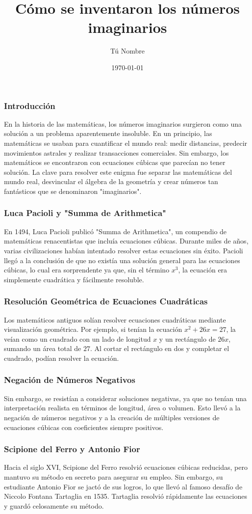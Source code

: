 \documentclass{beamer}
\title{Cómo se inventaron los números imaginarios}
\author{Tú Nombre}
\date{\today}
\begin{document}
\frame{\titlepage}

\begin{frame}
\frametitle{Introducción}
En la historia de las matemáticas, los números imaginarios surgieron como una solución a un problema aparentemente insoluble. En un principio, las matemáticas se usaban para cuantificar el mundo real: medir distancias, predecir movimientos astrales y realizar transacciones comerciales. Sin embargo, los matemáticos se encontraron con ecuaciones cúbicas que parecían no tener solución. La clave para resolver este enigma fue separar las matemáticas del mundo real, desvincular el álgebra de la geometría y crear números tan fantásticos que se denominaron "imaginarios".
\end{frame}

\begin{frame}
\frametitle{Luca Pacioli y "Summa de Arithmetica"}
En 1494, Luca Pacioli publicó "Summa de Arithmetica", un compendio de matemáticas renacentistas que incluía ecuaciones cúbicas. Durante miles de años, varias civilizaciones habían intentado resolver estas ecuaciones sin éxito. Pacioli llegó a la conclusión de que no existía una solución general para las ecuaciones cúbicas, lo cual era sorprendente ya que, sin el término $x^3$, la ecuación era simplemente cuadrática y fácilmente resoluble.
\end{frame}

\begin{frame}
\frametitle{Resolución Geométrica de Ecuaciones Cuadráticas}
Los matemáticos antiguos solían resolver ecuaciones cuadráticas mediante visualización geométrica. Por ejemplo, si tenían la ecuación $x^2 + 26x = 27$, la veían como un cuadrado con un lado de longitud $x$ y un rectángulo de $26x$, sumando un área total de $27$. Al cortar el rectángulo en dos y completar el cuadrado, podían resolver la ecuación.
\end{frame}

\begin{frame}
\frametitle{Negación de Números Negativos}
Sin embargo, se resistían a considerar soluciones negativas, ya que no tenían una interpretación realista en términos de longitud, área o volumen. Esto llevó a la negación de números negativos y a la creación de múltiples versiones de ecuaciones cúbicas con coeficientes siempre positivos.
\end{frame}

\begin{frame}
\frametitle{Scipione del Ferro y Antonio Fior}
Hacia el siglo XVI, Scipione del Ferro resolvió ecuaciones cúbicas reducidas, pero mantuvo su método en secreto para asegurar su empleo. Sin embargo, su estudiante Antonio Fior se jactó de sus logros, lo que llevó al famoso desafío de Niccolo Fontana Tartaglia en 1535. Tartaglia resolvió rápidamente las ecuaciones y guardó celosamente su método.
\end{frame}
\end{document}

